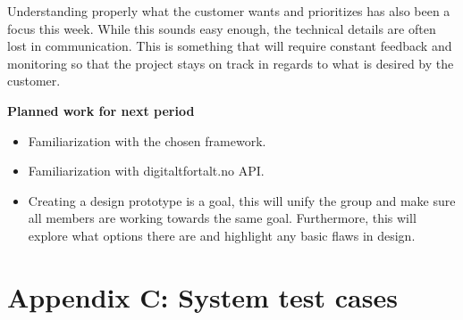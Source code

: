 		Understanding properly what the customer wants and prioritizes has also been a focus this week. While this sounds easy enough, the technical details are often lost in communication. This is something that will require constant feedback and monitoring so that the project stays on track in regards to what is desired by the customer.\newline
		
		\textbf{Planned work for next period}\newline
		\begin{itemize}[noitemsep]
			\item Familiarization with the chosen framework.
			\item Familiarization with digitaltfortalt.no API.
			\item Creating a design prototype is a goal, this will unify the group and make sure all members are working towards the same goal. Furthermore, this will explore what options there are and highlight any basic flaws in design.\newline
		\end{itemize}

		
\section{Appendix C: System test cases}

